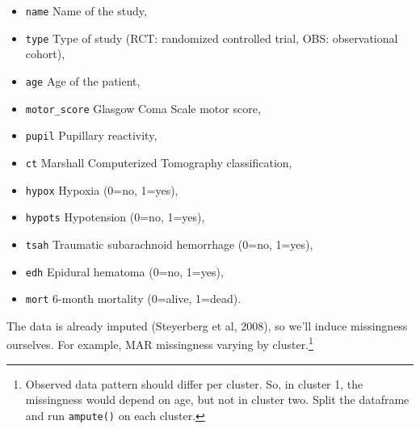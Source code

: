 \documentclass[
]{jss}
\providecommand{\tightlist}{%
  \setlength{\itemsep}{0pt}\setlength{\parskip}{0pt}}
\begin{document}
\begin{itemize}
\tightlist
\item
  \texttt{name} Name of the study,
\item
  \texttt{type} Type of study (RCT: randomized controlled trial, OBS:
  observational cohort),
\item
  \texttt{age} Age of the patient,
\item
  \texttt{motor\_score} Glasgow Coma Scale motor score,
\item
  \texttt{pupil} Pupillary reactivity,
\item
  \texttt{ct} Marshall Computerized Tomography classification,
\item
  \texttt{hypox} Hypoxia (0=no, 1=yes),
\item
  \texttt{hypots} Hypotension (0=no, 1=yes),
\item
  \texttt{tsah} Traumatic subarachnoid hemorrhage (0=no, 1=yes),
\item
  \texttt{edh} Epidural hematoma (0=no, 1=yes),
\item
  \texttt{mort} 6-month mortality (0=alive, 1=dead).
\end{itemize}

The data is already imputed (Steyerberg et al, 2008), so we'll induce
missingness ourselves. For example, MAR missingness varying by
cluster.\footnote{Observed data pattern should differ per cluster. So,
  in cluster 1, the missingness would depend on age, but not in cluster
  two. Split the dataframe and run \texttt{ampute()} on each cluster.}
\end{document}
